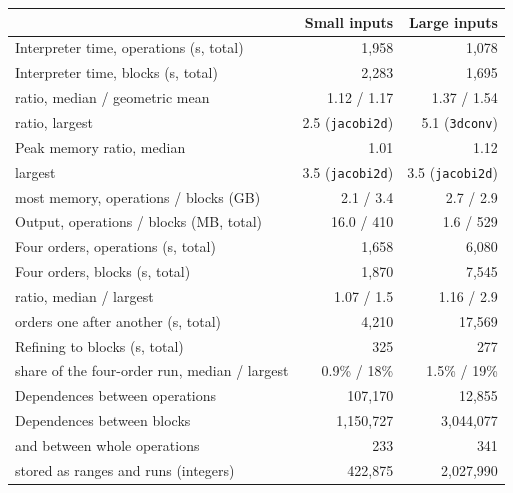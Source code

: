 \begin{tabular}{lrr}
\toprule
 & Small inputs & Large inputs \\
\midrule
Interpreter time, operations (s, total) & 1,958 & 1,078 \\
Interpreter time, blocks (s, total) & 2,283 & 1,695 \\
\quad ratio, median / geometric mean & 1.12 / 1.17 & 1.37 / 1.54 \\
\quad ratio, largest & 2.5 (\texttt{jacobi2d}) & 5.1 (\texttt{3dconv}) \\
Peak memory ratio, median & 1.01 & 1.12 \\
\quad largest & 3.5 (\texttt{jacobi2d}) & 3.5 (\texttt{jacobi2d}) \\
\quad most memory, operations / blocks (GB) & 2.1 / 3.4 & 2.7 / 2.9 \\
Output, operations / blocks (MB, total) & 16.0 / 410 & 1.6 / 529 \\
\midrule
Four orders, operations (s, total) & 1,658 & 6,080 \\
Four orders, blocks (s, total) & 1,870 & 7,545 \\
\quad ratio, median / largest & 1.07 / 1.5 & 1.16 / 2.9 \\
\quad orders one after another (s, total) & 4,210 & 17,569 \\
\midrule
Refining to blocks (s, total) & 325 & 277 \\
\quad share of the four-order run, median / largest & 0.9\% / 18\% & 1.5\% / 19\% \\
Dependences between operations & 107,170 & 12,855 \\
Dependences between blocks & 1,150,727 & 3,044,077 \\
\quad and between whole operations & 233 & 341 \\
\quad stored as ranges and runs (integers) & 422,875 & 2,027,990 \\
\bottomrule
\end{tabular}
